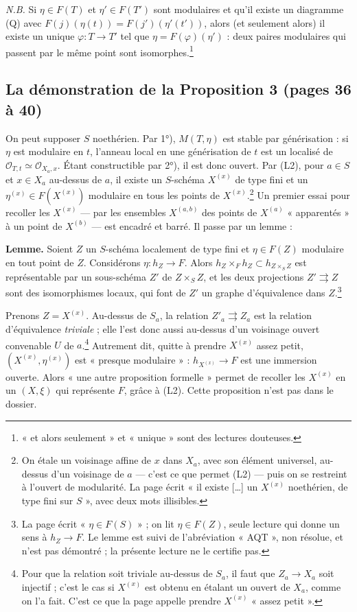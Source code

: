 \documentclass[11pt,a4paper]{article}
\begin{document}
\emph{N.B.} Si $\eta \in F(T)$ et $\eta' \in F(T')$ sont modulaires et qu'il
existe un diagramme (Q) avec $F(j)(\eta(t)) = F(j')(\eta'(t'))$, alors (et
seulement alors) il existe un unique $\varphi : T \to T'$ tel que $\eta =
F(\varphi)(\eta')$ : deux paires modulaires qui passent par le même point
sont isomorphes.\footnote{« et alors seulement » et « unique » sont des
lectures douteuses.}

\subsection*{La démonstration de la Proposition 3 (pages 36 à 40)}

On peut supposer $S$ noethérien. Par 1°), $M(T, \eta)$ est stable par
générisation : si $\eta$ est modulaire en $t$, l'anneau local en une
générisation de $t$ est un localisé de $\mathcal{O}_{T,t} \simeq
\mathcal{O}_{X_a,x}$. Étant constructible par 2°), il est donc ouvert. Par
(L2), pour $a \in S$ et $x \in X_a$ au-dessus de $a$, il existe un $S$-schéma
$X^{(x)}$ de type fini et un $\eta^{(x)} \in F(X^{(x)})$ modulaire en tous
les points de $X^{(x)}$.\footnote{On étale un voisinage affine de $x$ dans
$X_a$, avec son élément universel, au-dessus d'un voisinage de $a$ — c'est ce
que permet (L2) — puis on se restreint à l'ouvert de modularité. La page
écrit « il existe [\ldots] un $X^{(x)}$ noethérien, de type fini sur $S$ »,
avec deux mots illisibles.} Un premier essai pour recoller les $X^{(x)}$ —
par les ensembles $X^{(a,b)}$ des points de $X^{(a)}$ « apparentés » à un
point de $X^{(b)}$ — est encadré et barré. Il passe par un lemme :

\textbf{Lemme.} Soient $Z$ un $S$-schéma localement de type fini et $\eta \in
F(Z)$ modulaire en tout point de $Z$. Considérons $\eta : h_Z \to F$. Alors
$h_Z \times_F h_Z \subset h_{Z \times_S Z}$ est représentable par un
sous-schéma $Z'$ de $Z \times_S Z$, et les deux projections $Z'
\rightrightarrows Z$ sont des isomorphismes locaux, qui font de $Z'$ un
graphe d'équivalence dans $Z$.\footnote{La page écrit « $\eta \in F(S)$ » ;
on lit $\eta \in F(Z)$, seule lecture qui donne un sens à $h_Z \to F$. Le
lemme est suivi de l'abréviation « AQT », non résolue, et n'est pas
démontré ; la présente lecture ne le certifie pas.}

Prenons $Z = X^{(x)}$. Au-dessus de $S_a$, la relation $Z'_a
\rightrightarrows Z_a$ est la relation d'équivalence \emph{triviale} ; elle
l'est donc aussi au-dessus d'un voisinage ouvert convenable $U$ de
$a$.\footnote{Pour que la relation soit triviale au-dessus de $S_a$, il faut
que $Z_a \to X_a$ soit injectif ; c'est le cas si $X^{(x)}$ est obtenu en
étalant un ouvert de $X_a$, comme on l'a fait. C'est ce que la page appelle
prendre $X^{(x)}$ « assez petit ».} Autrement dit, quitte à prendre $X^{(x)}$
assez petit, $(X^{(x)}, \eta^{(x)})$ est « presque modulaire » : $h_{X^{(x)}}
\to F$ est une immersion ouverte. Alors « une autre proposition formelle »
permet de recoller les $X^{(x)}$ en un $(X, \xi)$ qui représente $F$, grâce à
(L2). Cette proposition n'est pas dans le dossier.
\end{document}
